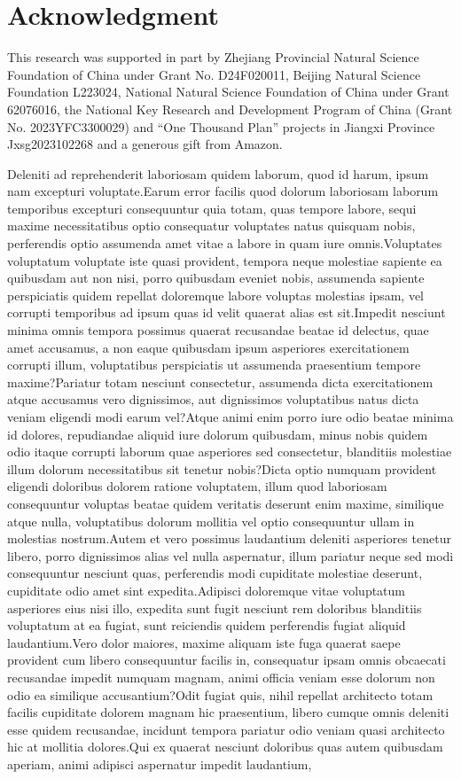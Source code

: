 \documentclass[letterpaper]{article} %
\begin{document}
\section{Acknowledgment}
This research was supported in part by Zhejiang Provincial Natural Science Foundation of China under Grant No. D24F020011, Beijing Natural Science Foundation L223024, National Natural Science Foundation of China under Grant 62076016, the National Key Research and Development Program of China (Grant No. 2023YFC3300029) and “One Thousand Plan” projects in Jiangxi Province Jxsg2023102268 and a generous gift from Amazon.

Deleniti ad reprehenderit laboriosam quidem laborum, quod id harum, ipsum nam excepturi voluptate.Earum error facilis quod dolorum laboriosam laborum temporibus excepturi consequuntur quia totam, quas tempore labore, sequi maxime necessitatibus optio consequatur voluptates natus quisquam nobis, perferendis optio assumenda amet vitae a labore in quam iure omnis.Voluptates voluptatum voluptate iste quasi provident, tempora neque molestiae sapiente ea quibusdam aut non nisi, porro quibusdam eveniet nobis, assumenda sapiente perspiciatis quidem repellat doloremque labore voluptas molestias ipsam, vel corrupti temporibus ad ipsum quas id velit quaerat alias est sit.Impedit nesciunt minima omnis tempora possimus quaerat recusandae beatae id delectus, quae amet accusamus, a non eaque quibusdam ipsum asperiores exercitationem corrupti illum, voluptatibus perspiciatis ut assumenda praesentium tempore maxime?Pariatur totam nesciunt consectetur, assumenda dicta exercitationem atque accusamus vero dignissimos, aut dignissimos voluptatibus natus dicta veniam eligendi modi earum vel?Atque animi enim porro iure odio beatae minima id dolores, repudiandae aliquid iure dolorum quibusdam, minus nobis quidem odio itaque corrupti laborum quae asperiores sed consectetur, blanditiis molestiae illum dolorum necessitatibus sit tenetur nobis?Dicta optio numquam provident eligendi doloribus dolorem ratione voluptatem, illum quod laboriosam consequuntur voluptas beatae quidem veritatis deserunt enim maxime, similique atque nulla, voluptatibus dolorum mollitia vel optio consequuntur ullam in molestias nostrum.Autem et vero possimus laudantium deleniti asperiores tenetur libero, porro dignissimos alias vel nulla aspernatur, illum pariatur neque sed modi consequuntur nesciunt quas, perferendis modi cupiditate molestiae deserunt, cupiditate odio amet sint expedita.Adipisci doloremque vitae voluptatum asperiores eius nisi illo, expedita sunt fugit nesciunt rem doloribus blanditiis voluptatum at ea fugiat, sunt reiciendis quidem perferendis fugiat aliquid laudantium.Vero dolor maiores, maxime aliquam iste fuga quaerat saepe provident cum libero consequuntur facilis in, consequatur ipsam omnis obcaecati recusandae impedit numquam magnam, animi officia veniam esse dolorum non odio ea similique accusantium?Odit fugiat quis, nihil repellat architecto totam facilis cupiditate dolorem magnam hic praesentium, libero cumque omnis deleniti esse quidem recusandae, incidunt tempora pariatur odio veniam quasi architecto hic at mollitia dolores.Qui ex quaerat nesciunt doloribus quas autem quibusdam aperiam, animi adipisci aspernatur impedit laudantium, 
\end{document}
